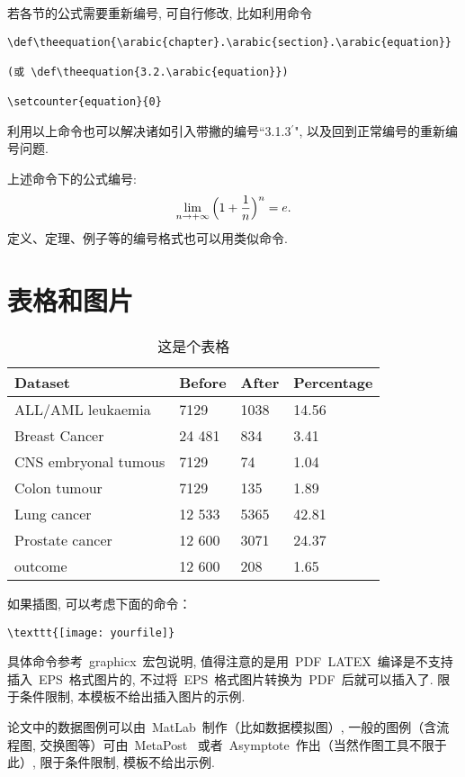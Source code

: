 \documentclass[notitlepage,cs4size,punct,oneside]{ctexrep}
\numberwithin{equation}{chapter}
\theoremstyle{mystyle}
\def\theequation{\arabic{chapter}.\arabic{equation}}
\begin{document}
若各节的公式需要重新编号, 可自行修改, 比如利用命令
\begin{verbatim}
\def\theequation{\arabic{chapter}.\arabic{section}.\arabic{equation}}

(或 \def\theequation{3.2.\arabic{equation}})

\setcounter{equation}{0}
\end{verbatim}
利用以上命令也可以解决诸如引入带撇的编号``3.1.3$^\prime$", 以及回到正常编号的重新编号问题.

\def\theequation{\arabic{chapter}.\arabic{section}.\arabic{equation}}
\setcounter{equation}{0}

上述命令下的公式编号:
\begin{equation}
\lim_{n\to +\infty}\Big(1+{1\over n}\Big)^n=e.
\end{equation}
定义、定理、例子等的编号格式也可以用类似命令.

\chapter{表格和图片}
\begin{table}[htbp]\centering
\begin{tabular}{llll}
\hline\hline
Dataset             & Before      & After     & Percentage \\
\hline
ALL/AML leukaemia   & 7129        & 1038      & 14.56      \\
Breast Cancer       & 24 481      & 834       & 3.41       \\
CNS embryonal tumous& 7129        & 74        & 1.04       \\
Colon tumour        & 7129        & 135       & 1.89       \\
Lung cancer         & 12 533      & 5365      & 42.81      \\
Prostate cancer     & 12 600      & 3071      & 24.37      \\
outcome             & 12 600      & 208       & 1.65       \\
\hline
\end{tabular}
\caption{这是个表格}\label{tab:hh}
\end{table}

如果插图, 可以考虑下面的命令：
\begin{verbatim}
\texttt{[image: yourfile]}
\end{verbatim}
具体命令参考~graphicx~宏包说明,
值得注意的是用~PDF\, LATEX~编译是不支持插入~EPS~格式图片的,
不过将~EPS~格式图片转换为~PDF~后就可以插入了. 限于条件限制, 本模板不给出插入图片的示例.
\par
论文中的数据图例可以由~MatLab~制作（比如数据模拟图）,
一般的图例（含流程图, 交换图等）可由~MetaPost~
或者~Asymptote~作出（当然作图工具不限于此）, 限于条件限制,
模板不给出示例.
\end{document}
